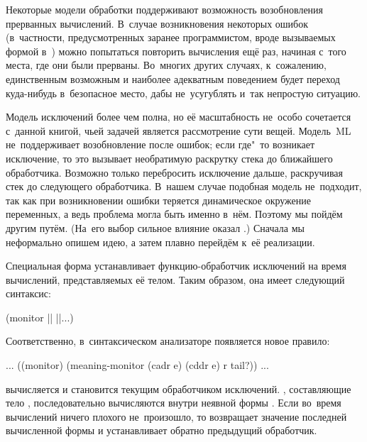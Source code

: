 Некоторые модели обработки поддерживают возможность возобновления прерванных
вычислений. В~случае возникновения некоторых ошибок (в~частности,
предусмотренных заранее программистом, вроде вызываемых формой 
в~{\CommonLisp}) можно попытаться повторить вычисления ещё раз, начиная с~того
места, где они были прерваны. Во~многих других случаях, к~сожалению,
единственным возможным и наиболее адекватным поведением будет переход
куда-нибудь в~безопасное место, дабы не~усугублять и~так непростую ситуацию.

Модель исключений {\CommonLisp} более чем полна, но её масштабность не~особо
сочетается с~данной книгой, чьей задачей является рассмотрение сути вещей.
Модель~ML не~поддерживает возобновление после ошибок; если где"~то возникает
исключение, то это вызывает необратимую раскрутку стека до ближайшего
обработчика. Возможно только перебросить исключение дальше, раскручивая стек до
следующего обработчика. В~нашем случае подобная модель не~подходит, так как при
возникновении ошибки теряется динамическое окружение переменных, а ведь проблема
могла быть именно в~нём. Поэтому мы пойдём другим путём. (На~его выбор сильное
влияние оказал \EuLisp.) Сначала мы неформально опишем идею, а затем плавно
перейдём к~её реализации.

Специальная форма  устанавливает функцию-обработчик исключений на
время вычислений, представляемых её телом. Таким образом, она имеет следующий
синтаксис:

\begin{code:lisp}
(monitor || ||...)
\end{code:lisp}

Соответственно, в~синтаксическом анализаторе  появляется новое
правило:

\begin{code:lisp}
... ((monitor) (meaning-monitor (cadr e) (cddr e) r tail?)) ...
\end{code:lisp}

 вычисляется и становится текущим обработчиком исключений.
, составляющие тело , последовательно вычисляются
внутри неявной формы . Если во~время вычислений ничего плохого
не~произошло, то  возвращает значение последней вычисленной формы и
устанавливает обратно предыдущий обработчик.

